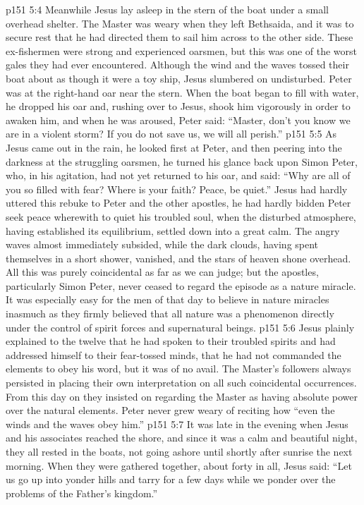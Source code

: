 \vs p151 5:4 Meanwhile Jesus lay asleep in the stern of the boat under a small overhead shelter. The Master was weary when they left Bethsaida, and it was to secure rest that he had directed them to sail him across to the other side. These ex\hyp{}fishermen were strong and experienced oarsmen, but this was one of the worst gales they had ever encountered. Although the wind and the waves tossed their boat about as though it were a toy ship, Jesus slumbered on undisturbed. Peter was at the right\hyp{}hand oar near the stern. When the boat began to fill with water, he dropped his oar and, rushing over to Jesus, shook him vigorously in order to awaken him, and when he was aroused, Peter said: “Master, don’t you know we are in a violent storm? If you do not save us, we will all perish.”
\vs p151 5:5 As Jesus came out in the rain, he looked first at Peter, and then peering into the darkness at the struggling oarsmen, he turned his glance back upon Simon Peter, who, in his agitation, had not yet returned to his oar, and said: \textcolor{ubdarkred}{“Why are all of you so filled with fear? Where is your faith? Peace, be quiet.”} Jesus had hardly uttered this rebuke to Peter and the other apostles, he had hardly bidden Peter seek peace wherewith to quiet his troubled soul, when the disturbed atmosphere, having established its equilibrium, settled down into a great calm. The angry waves almost immediately subsided, while the dark clouds, having spent themselves in a short shower, vanished, and the stars of heaven shone overhead. All this was purely coincidental as far as we can judge; but the apostles, particularly Simon Peter, never ceased to regard the episode as a nature miracle. It was especially easy for the men of that day to believe in nature miracles inasmuch as they firmly believed that all nature was a phenomenon directly under the control of spirit forces and supernatural beings.
\vs p151 5:6 Jesus plainly explained to the twelve that he had spoken to their troubled spirits and had addressed himself to their fear\hyp{}tossed minds, that he had not commanded the elements to obey his word, but it was of no avail. The Master’s followers always persisted in placing their own interpretation on all such coincidental occurrences. From this day on they insisted on regarding the Master as having absolute power over the natural elements. Peter never grew weary of reciting how “even the winds and the waves obey him.”
\vs p151 5:7 It was late in the evening when Jesus and his associates reached the shore, and since it was a calm and beautiful night, they all rested in the boats, not going ashore until shortly after sunrise the next morning. When they were gathered together, about forty in all, Jesus said: \textcolor{ubdarkred}{“Let us go up into yonder hills and tarry for a few days while we ponder over the problems of the Father’s kingdom.”}
